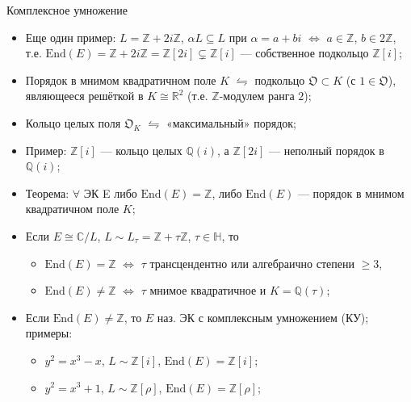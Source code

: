 \documentclass[serif, aspectratio=169]{beamer}
\begin{document}
\begin{frame}{Комплексное умножение}
    \begin{itemize}
        \item Еще один пример: $L=\mathbb{Z}+2i\mathbb{Z}$, $\alpha L\subseteq L$ при $\alpha=a+bi$ $\Leftrightarrow$ $a\in\mathbb{Z}$, $b\in2\mathbb{Z}$, т.е. $\mathrm{End}(E)=\mathbb{Z}+2i\mathbb{Z}=\mathbb{Z}[2i]\subsetneq\mathbb{Z}[i]$ --- собственное подкольцо $\mathbb{Z}[i]$;
        \item Порядок в мнимом квадратичном поле $K$ $\leftrightharpoons$ подкольцо $\mathfrak{O}\subset K$ (с $1\in\mathfrak{O}$), являющееся решёткой в $K\cong\mathbb{R}^2$ (т.е. $\mathbb{Z}$-модулем ранга $2$);
        \item Кольцо целых поля $\mathfrak{O}_K$ $\leftrightharpoons$ «максимальный» порядок;
        \item Пример: $\mathbb{Z}[i]$ --- кольцо целых $\mathbb{Q}(i)$, а $\mathbb{Z}[2i]$ --- неполный порядок в $\mathbb{Q}(i)$;
        \item Теорема: $\forall$ ЭК E либо $\mathrm{End}(E)=\mathbb{Z}$, либо $\mathrm{End}(E)$ --- порядок в мнимом квадратичном поле $K$;
        \item Если $E\cong\mathbb{C}/L$, $L\sim L_\tau=\mathbb{Z}+\tau\mathbb{Z}$, $\tau\in\mathbb{H}$, то 
        \begin{itemize}
            \item $\mathrm{End}(E)=\mathbb{Z}$ $\Leftrightarrow$ $\tau$ трансцендентно или алгебраично степени $\geq3$,
            \item $\mathrm{End}(E)\neq\mathbb{Z}$ $\Leftrightarrow$ $\tau$ мнимое квадратичное и $K=\mathbb{Q}(\tau)$;
        \end{itemize}
        \item Если $\mathrm{End}(E)\neq\mathbb{Z}$, то $E$ наз. ЭК с комплексным умножением (КУ); примеры:
        \begin{itemize}
            \item $y^2=x^3-x$, $L\sim\mathbb{Z}[i]$, $\mathrm{End}(E)=\mathbb{Z}[i]$;
            \item $y^2=x^3+1$, $L\sim\mathbb{Z}[\rho]$, $\mathrm{End}(E)=\mathbb{Z}[\rho]$;
        \end{itemize}
    \end{itemize}
    \note{
        \begin{itemize}
            \item ---
        \end{itemize}
    }
\end{frame}
\end{document}
